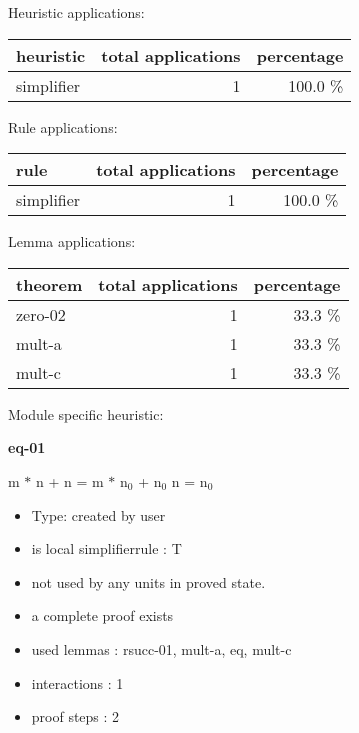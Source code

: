 \documentclass[a4paper]{article}
\begin{document}
\medskip


Heuristic applications:

\begin{supertabular}{l|r|r}
heuristic	& total applications & percentage \\ \hline
simplifier & 1 & 100.0 \% \\

\end{supertabular}

Rule applications:

\begin{supertabular}{l|r|r}
rule	        & total applications & percentage \\ \hline
simplifier & 1 & 100.0 \% \\

\end{supertabular}

Lemma applications:

\begin{supertabular}{l|r|r}
theorem	        & total applications & percentage \\ \hline
zero-02 & 1 & 33.3 \% \\
mult-a & 1 & 33.3 \% \\
mult-c & 1 & 33.3 \% \\

\end{supertabular}

Module specific heuristic:

\pagebreak

{\LARGE\bf eq-01}\label{lemma-eq-01}

\medskip

 \Fol m $*$ n + n = m $*$ $\mbox{n}_{0}$ + $\mbox{n}_{0}$ \Equiv n = $\mbox{n}_{0}$

\begin{itemize}

\item Type: created by user

\item is local simplifierrule : T
\item not used by any units in proved state.
\item       a complete proof exists
\item       used lemmas  : rsucc-01, mult-a, eq, mult-c
\item       interactions : 1
\item       proof steps  : 2
\end{itemize}
\end{document}
